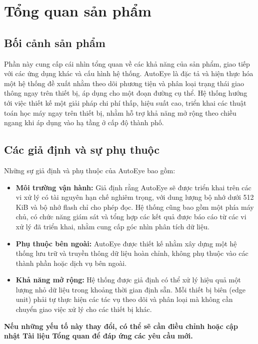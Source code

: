 \section{Tổng quan sản phẩm}
\subsection{Bối cảnh sản phẩm}
\quad Phần này cung cấp cái nhìn tổng quan về các khả năng của sản phẩm, giao tiếp với các ứng dụng khác và cấu hình hệ thống. AutoEye là đặc tả và hiện thực hóa một hệ thống đề xuất nhằm theo dõi phương tiện và phân loại trạng thái giao thông ngay trên thiết bị, áp dụng cho một đoạn đường cụ thể. Hệ thống hướng tới việc thiết kế một giải pháp chi phí thấp, hiệu suất cao, triển khai các thuật toán học máy ngay trên thiết bị, nhằm hỗ trợ khả năng mở rộng theo chiều ngang khi áp dụng vào hạ tầng ở cấp độ thành phố.

\subsection{Các giả định và sự phụ thuộc}
\quad Những sự giả định và phụ thuộc của AutoEye bao gồm:


\begin{itemize}
    \item \textbf{Môi trường vận hành:} Giả định rằng AutoEye sẽ được triển khai trên các vi xử lý có tài nguyên hạn chế nghiêm trọng, với dung lượng bộ nhớ dưới 512 KiB và bộ nhớ flash chỉ cho phép đọc. Hệ thống cũng bao gồm một phía máy chủ, có chức năng giám sát và tổng hợp các kết quả được báo cáo từ các vi xử lý đã triển khai, nhằm cung cấp góc nhìn phân tích dữ liệu.
    
    \item \textbf{Phụ thuộc bên ngoài:} AutoEye được thiết kế nhằm xây dựng một hệ thống lưu trữ và truyền thông dữ liệu hoàn chỉnh, không phụ thuộc vào các thành phần hoặc dịch vụ bên ngoài.
    
    \item \textbf{Khả năng mở rộng:} Hệ thống được giả định có thể xử lý hiệu quả một lượng nhỏ dữ liệu trong khoảng thời gian định sẵn. Mỗi thiết bị biên (edge unit) phải tự thực hiện các tác vụ theo dõi và phân loại mà không cần chuyển giao việc xử lý cho các thiết bị khác.
\end{itemize}

\quad \textbf{Nếu những yếu tố này thay đổi, có thể sẽ cần điều chỉnh hoặc cập nhật Tài liệu Tổng quan để đáp ứng các yêu cầu mới.}

